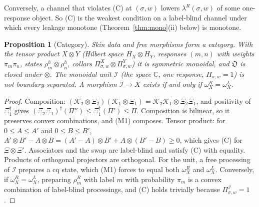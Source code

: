 \documentclass[11pt]{article}
\newtheorem{proposition}[theorem]{Proposition}
\theoremstyle{definition}
\theoremstyle{remark}
\newcommand{\Obj}{\mathfrak{O}}
\begin{document}
Conversely, a channel that violates (C) at $(\sigma,w)$ lowers $\lambda^R(\sigma,w)$ of some one-response object. So (C) is the weakest condition on a label-blind channel under which every leakage monotone (Theorem~\ref{thm:mono}(ii) below) is monotone.

\begin{proposition}[Category]\label{prop:cat}
Skin data and free morphisms form a category. With the tensor product $X\otimes Y$ (Hilbert space $H_X\otimes H_Y$, responses $(m,n)$ with weights $\pi_m\pi_n$, states $\rho^h_m\otimes\rho^h_n$, collars $\Pi^X_{\sigma,w}\otimes\Pi^Y_{\sigma,w}$) it is symmetric monoidal, and $\Obj$ is closed under $\otimes$. The monoidal unit $\mathcal I$ (the space $\mathbb C$, one response, $\Pi_{\sigma,w}=1$) is not boundary-separated. A morphism $\mathcal I\to X$ exists if and only if $\omega^R_X=\omega^L_X$.
\end{proposition}
\begin{proof}
Composition: $(\mathcal K_2\otimes\Xi_2)(\mathcal K_1\otimes\Xi_1)=\mathcal K_2\mathcal K_1\otimes\Xi_2\Xi_1$, and positivity of $\Xi_1^\dagger$ gives $(\Xi_2\Xi_1)^\dagger(\Pi'')\le\Xi_1^\dagger(\Pi')\le\Pi$. Composition is bilinear, so it preserves convex combinations, and (M1) composes. Tensor product: for $0\le A\le A'$ and $0\le B\le B'$, $A'\otimes B'-A\otimes B=(A'-A)\otimes B'+A\otimes(B'-B)\ge0$, which gives (C) for $\Xi\otimes\Xi'$. Associators and the swap are label-blind and satisfy (C) with equality. Products of orthogonal projectors are orthogonal. For the unit, a free processing of $\mathcal I$ prepares a cq state, which (M1) forces to equal both $\omega^R_X$ and $\omega^L_X$. Conversely, if $\omega^R_X=\omega^L_X$, preparing $\rho^R_m$ with label $m$ with probability $\pi_m$ is a convex combination of label-blind processings, and (C) holds trivially because $\Pi^{\mathcal I}_{\sigma,w}=1$.
\end{proof}
\end{document}
